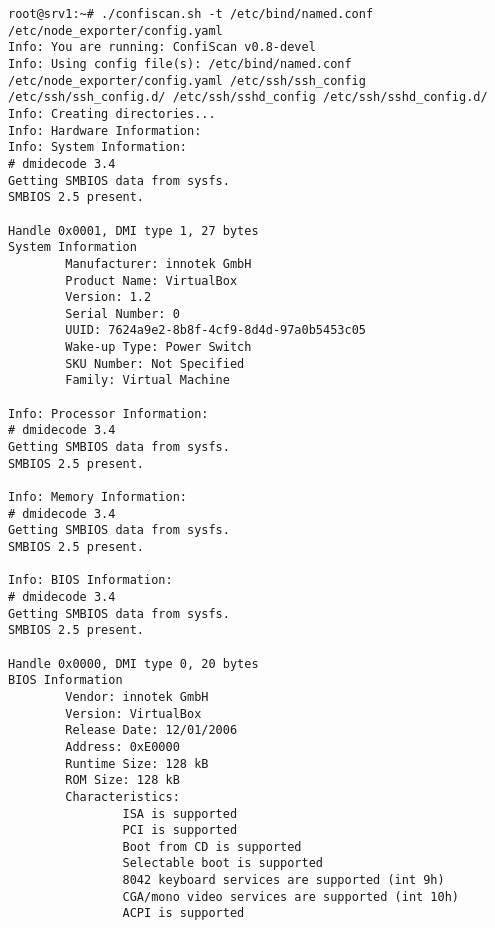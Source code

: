 \begin{longlisting}
  \begin{verbatim}
root@srv1:~# ./confiscan.sh -t /etc/bind/named.conf /etc/node_exporter/config.yaml
Info: You are running: ConfiScan v0.8-devel
Info: Using config file(s): /etc/bind/named.conf /etc/node_exporter/config.yaml /etc/ssh/ssh_config /etc/ssh/ssh_config.d/ /etc/ssh/sshd_config /etc/ssh/sshd_config.d/
Info: Creating directories...
Info: Hardware Information:
Info: System Information:
# dmidecode 3.4
Getting SMBIOS data from sysfs.
SMBIOS 2.5 present.

Handle 0x0001, DMI type 1, 27 bytes
System Information
        Manufacturer: innotek GmbH
        Product Name: VirtualBox
        Version: 1.2
        Serial Number: 0
        UUID: 7624a9e2-8b8f-4cf9-8d4d-97a0b5453c05
        Wake-up Type: Power Switch
        SKU Number: Not Specified
        Family: Virtual Machine

Info: Processor Information:
# dmidecode 3.4
Getting SMBIOS data from sysfs.
SMBIOS 2.5 present.

Info: Memory Information:
# dmidecode 3.4
Getting SMBIOS data from sysfs.
SMBIOS 2.5 present.

Info: BIOS Information:
# dmidecode 3.4
Getting SMBIOS data from sysfs.
SMBIOS 2.5 present.

Handle 0x0000, DMI type 0, 20 bytes
BIOS Information
        Vendor: innotek GmbH
        Version: VirtualBox
        Release Date: 12/01/2006
        Address: 0xE0000
        Runtime Size: 128 kB
        ROM Size: 128 kB
        Characteristics:
                ISA is supported
                PCI is supported
                Boot from CD is supported
                Selectable boot is supported
                8042 keyboard services are supported (int 9h)
                CGA/mono video services are supported (int 10h)
                ACPI is supported


\end{verbatim}
\end{longlisting}
